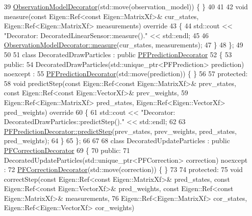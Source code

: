 \begin{DoxyCodeInclude}
39         \mbox{\hyperlink{classbfl_1_1ObservationModelDecorator}{ObservationModelDecorator}}(std::move(observation\_model)) \{ \}
40 
41 
42     \textcolor{keywordtype}{void} measure(\textcolor{keyword}{const} Eigen::Ref<const Eigen::MatrixXf>& cur\_states, Eigen::Ref<Eigen::MatrixXf> 
      measurements)\textcolor{keyword}{ override}
43 \textcolor{keyword}{    }\{
44         std::cout << \textcolor{stringliteral}{"Decorator: DecoratedLinearSensor::measure()."} << std::endl;
45 
46         \mbox{\hyperlink{classbfl_1_1ObservationModelDecorator_a6b0da9bcfe0fd1beb119c79f83f8cc9a}{ObservationModelDecorator::measure}}(cur\_states, measurements);
47     \}
48 \};
49 
50 
51 \textcolor{keyword}{class }DecoratedDrawParticles : \textcolor{keyword}{public} \mbox{\hyperlink{classbfl_1_1PFPredictionDecorator}{PFPredictionDecorator}}
52 \{
53 \textcolor{keyword}{public}:
54     DecoratedDrawParticles(std::unique\_ptr<PFPrediction> prediction) noexcept :
55         \mbox{\hyperlink{classbfl_1_1PFPredictionDecorator}{PFPredictionDecorator}}(std::move(prediction)) \{ \}
56 
57 \textcolor{keyword}{protected}:
58     \textcolor{keywordtype}{void} predictStep(\textcolor{keyword}{const} Eigen::Ref<const Eigen::MatrixXf>& prev\_states, \textcolor{keyword}{const} Eigen::Ref<const
       Eigen::VectorXf>& prev\_weights,
59                      Eigen::Ref<Eigen::MatrixXf> pred\_states, Eigen::Ref<Eigen::VectorXf> pred\_weights)\textcolor{keyword}{
       override}
60 \textcolor{keyword}{    }\{
61         std::cout << \textcolor{stringliteral}{"Decorator: DecoratedDrawParticles::predictStep()."} << std::endl;
62 
63         \mbox{\hyperlink{classbfl_1_1PFPredictionDecorator_af005f96b493e9ba72058613bbc7a8e43}{PFPredictionDecorator::predictStep}}(prev\_states, prev\_weights, 
      pred\_states, pred\_weights);
64     \}
65 \};
66 
67 
68 \textcolor{keyword}{class }DecoratedUpdateParticles : \textcolor{keyword}{public} \mbox{\hyperlink{classbfl_1_1PFCorrectionDecorator}{PFCorrectionDecorator}}
69 \{
70 \textcolor{keyword}{public}:
71     DecoratedUpdateParticles(std::unique\_ptr<PFCorrection> correction) noexcept :
72         \mbox{\hyperlink{classbfl_1_1PFCorrectionDecorator}{PFCorrectionDecorator}}(std::move(correction)) \{ \}
73 
74 \textcolor{keyword}{protected}:
75     \textcolor{keywordtype}{void} correctStep(\textcolor{keyword}{const} Eigen::Ref<const Eigen::MatrixXf>& pred\_states, \textcolor{keyword}{const} Eigen::Ref<const
       Eigen::VectorXf>& pred\_weights, \textcolor{keyword}{const} Eigen::Ref<const Eigen::MatrixXf>& measurements,
76                      Eigen::Ref<Eigen::MatrixXf> cor\_states, Eigen::Ref<Eigen::VectorXf> cor\_weights)\textcolor{keyword}{
}
\end{DoxyCodeInclude}

